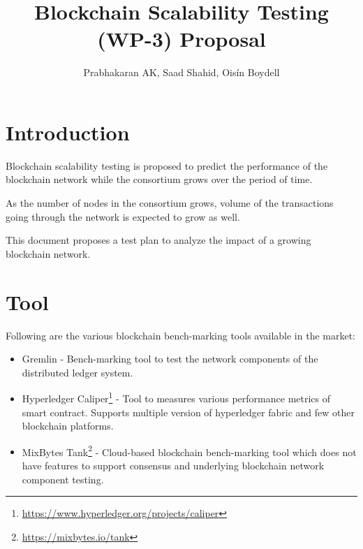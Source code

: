\documentclass{ceadar_article}
\begin{document}
\title{Blockchain Scalability Testing (WP-3) Proposal}


\author{Prabhakaran AK, Saad Shahid, Ois\'{i}n Boydell}

\maketitle

\newpage


\section{Introduction}

Blockchain scalability testing is proposed to predict the performance of the blockchain network while the consortium grows over the period of time.

As the number of nodes in the consortium grows, volume of the transactions going through the network is expected to grow as well. 

This document proposes a test plan to analyze the impact of a growing blockchain network.
\newline

\section{Tool}
Following are the various blockchain bench-marking tools available in the market:

\begin{itemize}
    \item Gremlin - Bench-marking tool to test the network components of the distributed ledger system.
    
    \item Hyperledger Caliper\footnote{\url{https://www.hyperledger.org/projects/caliper}}  - Tool to measures various performance metrics of smart contract. Supports multiple version of hyperledger fabric and few other blockchain platforms.
    
    \item MixBytes Tank\footnote{\url{https://mixbytes.io/tank}}  - Cloud-based blockchain bench-marking tool which does not have features to support consensus and underlying blockchain network component testing.
\end{itemize}
\end{document}
